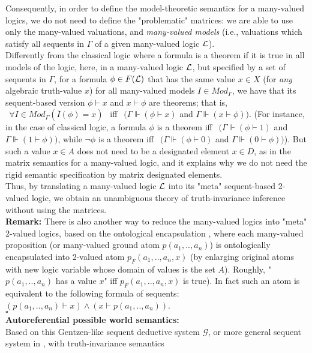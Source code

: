 \documentclass[10pt,twocolumn]{article}
\newcommand{\G}{\mathcal{G}} \renewcommand{\H}{\mathcal{H}}
\begin{document}
Consequently, in order to define the model-theoretic semantics for a
many-valued logics, we do not need to define the "problematic"
matrices: we are able to use only the many-valued valuations, and
\emph{many-valued models} (i.e., valuations which satisfy all
sequents in $\Gamma$ of
a given many-valued logic $\mathcal{L}$).\\
Differently from the classical logic where a formula is a theorem if
it is true in all models of the logic, here, in  a many-valued logic
$\mathcal{L}$, but specified by a set of sequents in $\Gamma$, for a formula
$\phi \in F(\mathcal{L})$ that has the same value $x \in X$ (for \emph{any}
algebraic truth-value $x$) for all many-valued models $I \in
Mod_{\Gamma}$, we have that its sequent-based version $\phi \vdash
x$ and $x \vdash \phi$ are theorems; that is, $~~\forall I\in
Mod_{\Gamma} (\overline{I}(\phi) = x)~~$ iff $~~(\Gamma \Vdash (\phi
\vdash x)$ and $\Gamma \Vdash (x \vdash \phi))$. (For instance, in
the case of classical logic, a formula $\phi$ is a theorem iff
$~~(\Gamma \Vdash (\phi \vdash 1)$ and $\Gamma \Vdash (1 \vdash
\phi))$, while $\neg \phi$ is a theorem iff $~~(\Gamma \Vdash (\phi
\vdash 0)$ and $\Gamma \Vdash (0 \vdash \phi))$). But such a value
$x \in A$ does not need to be a designated element $x \in D$, as in
the matrix semantics for a many-valued logic, and it explains why we
do not need the rigid semantic specification by matrix designated
elements.\\ Thus, by  translating  a many-valued logic $\mathcal{L}$ into its
"meta" sequent-based 2-valued logic, we obtain an unambiguous theory
of truth-invariance inference without using the matrices.
\\
\textbf{Remark:} There is also another way to reduce the many-valued
logics into "meta" 2-valued logics, based on the ontological
encapsulation \cite{Majk04on}, where each many-valued proposition
(or many-valued ground atom $p(a_1, ..,a_n)$) is ontologically
encapsulated into 2-valued atom $p_F(a_1, ..,a_n, x)$ (by enlarging
original atoms with new logic variable  whose domain of values is
the set $ A$). Roughly, "$p(a_1, ..,a_n)$ has a value $x$" iff
$p_F(a_1, ..,a_n, x)$ is true).
 In fact such an atom is equivalent to the following formula of
 sequents:
 $(p(a_1, ..,a_n) \vdash x) \wedge (x \vdash p(a_1,
 ..,a_n))$.
 \\$\square$\\
\textbf{Autoreferential possible world semantics:}\\
 Based on
this Gentzen-like sequent deductive system $\G$, or more general
sequent system in \cite{Majk09BS}, with truth-invariance semantics
\end{document}
